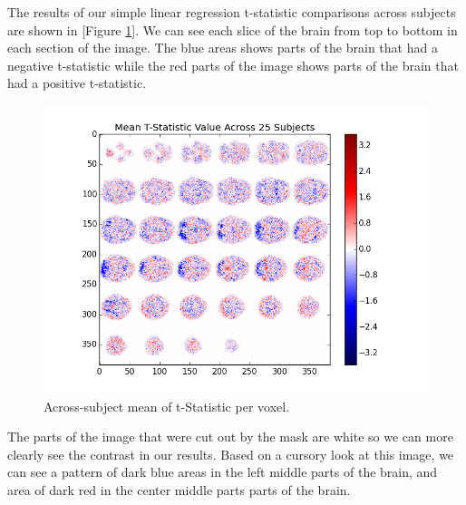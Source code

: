 \par \indent The results of our simple linear regression t-statistic comparisons across subjects are shown in [Figure \ref{fig:mask}]. We can see each slice of the brain from top to bottom in each section of the image. The blue areas shows parts of the brain that had a negative t-statistic while the red parts of the image shows parts of the brain that had a positive t-statistic.

\begin{figure}[ht]
\centering
\includegraphics[scale=0.5]{images/hypothesis_testing}  
\caption{Across-subject mean of t-Statistic per voxel.}
\label{fig:mask}
\end{figure}

\par The parts of the image that were cut out by the mask are white so we can more clearly see the contrast in our results. Based on a cursory look at this image, we can see a pattern of dark blue areas in the left middle parts of the brain, and area of dark red in the center middle parts parts of the brain. 



